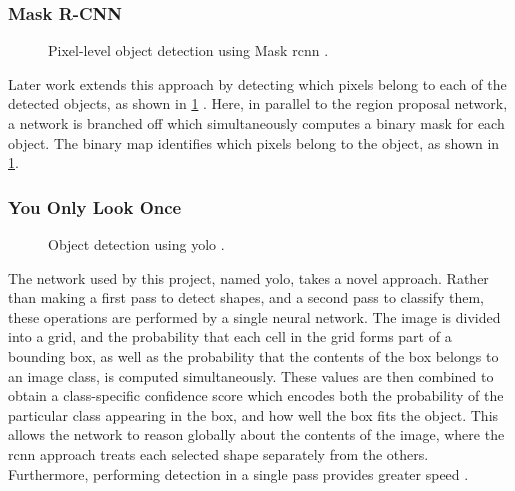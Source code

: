 \documentclass[\rootfolder/main.tex]{subfiles}
\begin{document}
\subsubsection{Mask R-CNN}

\begin{figure}[H]
    \caption[Pixel-level object detection using Mask \acrshort{rcnn}.]{Pixel-level object detection using Mask \acrshort{rcnn} \cite{He2017}.\label{fig:mask-rcnn}}
\end{figure}

Later work extends this approach by detecting which pixels belong to each of the detected objects, as shown in \cref{fig:mask-rcnn} \cite{He2017}.
Here, in parallel to the region proposal network, a network is branched off which simultaneously computes a binary mask for each object.
The binary map identifies which pixels belong to the object, as shown in \cref{fig:mask-rcnn}.

\subsubsection{You Only Look Once}

\begin{figure}[H]
    \caption[Object detection using \acrshort{yolo}.]{Object detection using \acrshort{yolo} \cite{JosephRedmon}.\label{fig:yolo}}
\end{figure}

The network used by this project, named \acrfull{yolo}, takes a novel approach.
Rather than making a first pass to detect shapes, and a second pass to classify them, these operations are performed by a single neural network.
The image is divided into a grid, and the probability that each cell in the grid forms part of a bounding box, as well as the probability that the contents of the box belongs to an image class, is computed simultaneously.
These values are then combined to obtain a class-specific confidence score which encodes both the probability of the particular class appearing in the box, and how well the box fits the object.
This allows the network to reason globally about the contents of the image, where the \acrshort{rcnn} approach treats each selected shape separately from the others.
Furthermore, performing detection in a single pass provides greater speed \cite{Redmon2015}.

\end{document}
